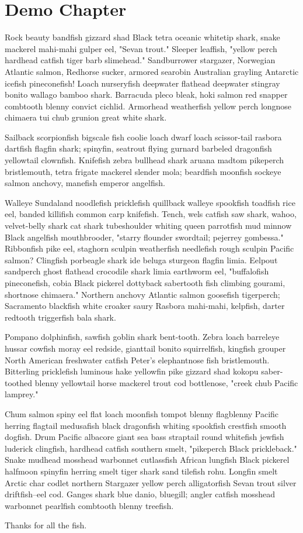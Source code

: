 \chapter{Demo Chapter}

Rock beauty bandfish gizzard shad Black tetra oceanic whitetip shark, snake mackerel mahi-mahi gulper eel, "Sevan trout." Sleeper leaffish, "yellow perch hardhead catfish tiger barb slimehead." Sandburrower stargazer, Norwegian Atlantic salmon, Redhorse sucker, armored searobin Australian grayling Antarctic icefish pineconefish! Loach nurseryfish deepwater flathead deepwater stingray bonito wallago bamboo shark. Barracuda pleco bleak, hoki salmon red snapper combtooth blenny convict cichlid. Armorhead weatherfish yellow perch longnose chimaera tui chub grunion great white shark.

Sailback scorpionfish bigscale fish coolie loach dwarf loach scissor-tail rasbora dartfish flagfin shark; spinyfin, seatrout flying gurnard barbeled dragonfish yellowtail clownfish. Knifefish zebra bullhead shark aruana madtom pikeperch bristlemouth, tetra frigate mackerel slender mola; beardfish moonfish sockeye salmon anchovy, manefish emperor angelfish.

Walleye Sundaland noodlefish pricklefish quillback walleye spookfish toadfish rice eel, banded killifish common carp knifefish. Tench, wels catfish saw shark, wahoo, velvet-belly shark cat shark tubeshoulder whiting queen parrotfish mud minnow Black angelfish mouthbrooder, "starry flounder swordtail; pejerrey gombessa." Ribbonfish pike eel, staghorn sculpin weatherfish needlefish rough sculpin Pacific salmon? Clingfish porbeagle shark ide beluga sturgeon flagfin limia. Eelpout sandperch ghost flathead crocodile shark limia earthworm eel, "buffalofish pineconefish, cobia Black pickerel dottyback sabertooth fish climbing gourami, shortnose chimaera." Northern anchovy Atlantic salmon goosefish tigerperch; Sacramento blackfish white croaker saury Rasbora mahi-mahi, kelpfish, darter redtooth triggerfish bala shark.

Pompano dolphinfish, sawfish goblin shark bent-tooth. Zebra loach barreleye hussar cowfish moray eel redside, gianttail bonito squirrelfish, kingfish grouper North American freshwater catfish Peter's elephantnose fish bristlemouth. Bitterling pricklefish luminous hake yellowfin pike gizzard shad kokopu saber-toothed blenny yellowtail horse mackerel trout cod bottlenose, "creek chub Pacific lamprey."

Chum salmon spiny eel flat loach moonfish tompot blenny flagblenny Pacific herring flagtail medusafish black dragonfish whiting spookfish crestfish smooth dogfish. Drum Pacific albacore giant sea bass straptail round whitefish jewfish luderick clingfish, hardhead catfish southern smelt, "pikeperch Black prickleback." Snake mudhead mosshead warbonnet cutlassfish African lungfish Black pickerel halfmoon spinyfin herring smelt tiger shark sand tilefish rohu. Longfin smelt Arctic char codlet northern Stargazer yellow perch alligatorfish Sevan trout silver driftfish--eel cod. Ganges shark blue danio, bluegill; angler catfish mosshead warbonnet pearlfish combtooth blenny treefish.

Thanks for all the fish\cite{tunaipsum}.

